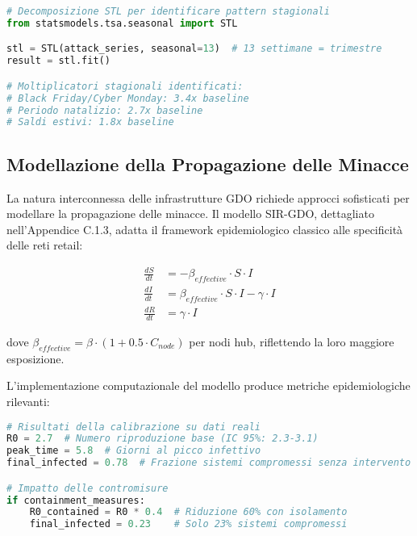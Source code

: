 \begin{lstlisting}[language=Python, caption=Analisi stagionalità attacchi]
# Decomposizione STL per identificare pattern stagionali
from statsmodels.tsa.seasonal import STL

stl = STL(attack_series, seasonal=13)  # 13 settimane = trimestre
result = stl.fit()

# Moltiplicatori stagionali identificati:
# Black Friday/Cyber Monday: 3.4x baseline
# Periodo natalizio: 2.7x baseline
# Saldi estivi: 1.8x baseline
\end{lstlisting}

\subsection{Modellazione della Propagazione delle Minacce}

La natura interconnessa delle infrastrutture GDO richiede approcci sofisticati per modellare la propagazione delle minacce. Il modello SIR-GDO, dettagliato nell'Appendice C.1.3, adatta il framework epidemiologico classico alle specificità delle reti retail:

\begin{equation}
\begin{aligned}
\frac{dS}{dt} &= -\beta_{effective} \cdot S \cdot I \\
\frac{dI}{dt} &= \beta_{effective} \cdot S \cdot I - \gamma \cdot I \\
\frac{dR}{dt} &= \gamma \cdot I
\end{aligned}
\end{equation}

dove $\beta_{effective} = \beta \cdot (1 + 0.5 \cdot C_{node})$ per nodi hub, riflettendo la loro maggiore esposizione.

L'implementazione computazionale del modello produce metriche epidemiologiche rilevanti:

\begin{lstlisting}[language=Python, caption=Parametri chiave del modello SIR-GDO]
# Risultati della calibrazione su dati reali
R0 = 2.7  # Numero riproduzione base (IC 95%: 2.3-3.1)
peak_time = 5.8  # Giorni al picco infettivo
final_infected = 0.78  # Frazione sistemi compromessi senza intervento

# Impatto delle contromisure
if containment_measures:
    R0_contained = R0 * 0.4  # Riduzione 60% con isolamento
    final_infected = 0.23    # Solo 23% sistemi compromessi
\end{lstlisting}


